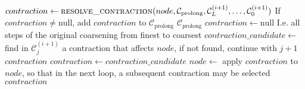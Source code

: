 \begin{algorithm*}
\begin{algorithmic}
            \State $ contraction \gets \Call{resolve\_contraction}{node, \mathcal{C}_\mathrm{prolong}, \mathcal{C}_L^{(i + 1)}, \dots, \mathcal{C}_0^{(i + 1)}} $
            \State If $ contraction \neq \mathrm{null} $, add $ contraction $ to $ \mathcal{C}_\mathrm{prolong} $
        \EndFor
        \State \Return $ \mathcal{C}_\mathrm{prolong} $
    \EndFunction
    \Statex
        \State $ contraction \gets \mathrm{null} $
         \Comment I.e. all steps of the original coarsening from finest to coarsest
            \State $ contraction\_candidate \gets $ find in $ \mathcal{C}_j^{(i + 1)} $ a contraction that affects $ node $, if not found, continue with $ j + 1 $
                \State \Return $ contraction $
            \EndIf
            \State $ contraction \gets contraction\_candidate $
            \State $ node \gets $ apply $ contraction $ to $ node $, so that in the next loop, a subsequent contraction may be selected
        \EndFor
        \State \Return $ contraction $
    \EndFunction
  \end{algorithmic}
\end{algorithm*}


